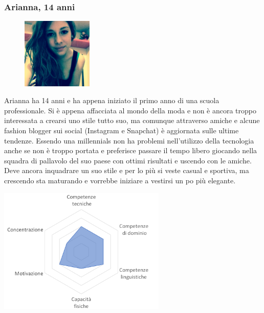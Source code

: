 \documentclass[12pt,a4paper]{report}
\begin{document}
\subsubsection*{Arianna, 14 anni}
\begin{figure}
  \centering
  \includegraphics[width=0.3\textwidth]{"Images Latex/Personas/Arianna"}
\end{figure}
Arianna ha 14 anni e ha appena iniziato il primo anno di una scuola professionale. Si è appena affacciata al mondo della moda e non è ancora troppo interessata a crearsi uno stile tutto suo, ma comunque attraverso amiche e alcune fashion blogger sui social (Instagram e Snapchat) è aggiornata sulle ultime tendenze. Essendo una millennials non ha problemi nell'utilizzo della tecnologia anche se non è troppo portata e preferisce passare il tempo libero giocando nella squadra di pallavolo del suo paese con ottimi risultati e uscendo con le amiche. Deve ancora inquadrare un suo stile e per lo più si veste casual e sportiva, ma crescendo sta maturando e vorrebbe iniziare a vestirsi un po più elegante.
\begin{center}
  \includegraphics[width=0.6\textwidth]{"Images Latex/Personas/Arianna14"}
\end{center}

\newpage
\end{document}
